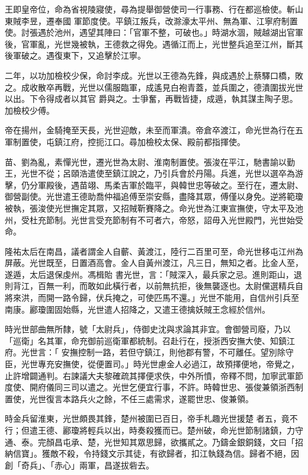 \begin{pinyinscope}
 王即皇帝位，命為省視陵寢使，尋為提舉御營使司一行事務、行在都巡檢使。斬山東賊李昱，遷奉國
 軍節度使。平鎮江叛兵，改滁濠太平州、無為軍、江寧府制置使。討張遇於池州，遇望其陣曰：「官軍不整，可破也。」時湖水涸，賊越湖出官軍後，官軍亂，光世幾被執，王德救之得免。遇循江而上，光世整兵追至江州，斷其後軍破之。遇復東下，又追擊於江寧。



 二年，以功加檢校少保，命討李成。光世以王德為先鋒，與成遇於上蔡驛口橋，敗之。成收散卒再戰，光世以儒服臨軍，成遙見白袍青蓋，並兵圍之，德潰圍拔光世以出。下令得成者以其官
 爵與之。士爭奮，再戰皆捷，成遁，執其謀主陶子思。加檢校少傅。



 帝在揚州，金騎掩至天長，光世迎敵，未至而軍潰。帝倉卒渡江，命光世為行在五軍制置使，屯鎮江府，控扼江口。尋加檢校太保、殿前都指揮使。



 苗、劉為亂，素憚光世，遷光世為太尉、淮南制置使。張浚在平江，馳書諭以勤王，光世不從；呂頤浩遣使至鎮江說之，乃引兵會於丹陽。兵進，光世以選卒為游擊，仍分軍殿後，遇苗翊、馬柔吉軍於臨平，與韓世忠等破之。至行在，遷太尉、
 御營副使。光世遣王德助喬仲福追傅至崇安縣，盡降其眾，傅僅以身免。逆將範瓊被執，張浚使光世撫定其眾，又招賊靳賽降之。命光世為江東宣撫使，守太平及池州，受杜充節制。光世言受充節制有不可者六，帝怒，詔毋入光世殿門，光世始受命。



 隆祐太后在南昌，議者謂金人自蘄、黃渡江，陸行二百里可至，命光世移屯江州為屏蔽。光世既至，日置酒高會。金人自黃州渡江，凡三日，無知之者。比金人至，遂遁，太后退保虔州。馮楫貽
 書光世，言：「賊深入，最兵家之忌。進則距山，退則背江，百無一利，而敢如此橫行者，以前無抗拒，後無襲逐也。太尉儻選精兵自將來洪，而開一路令歸，伏兵掩之，可使匹馬不還。」光世不能用，自信州引兵至南康。酈瓊圍固始縣，光世遣人招降之，又遣王德擒妖賊王念經於信州。



 時光世部曲無所隸，號「太尉兵」，侍御史沈與求論其非宜。會御營司廢，乃以「巡衛」名其軍，命充御前巡衛軍都統制。召赴行在，授浙西安撫大使、知鎮江府。光世言：「
 安撫控制一路，若但守鎮江，則他郡有警，不可離任。望別除守臣，光世專充安撫使，從便置司。」時光世慮金人必過江，故預擇便地，帝覺之，止許增闢通判。右諫議大夫黎確疏其擇便求佚，中外所憤，帝釋不問，加寧武軍節度使、開府儀同三司以遣之。光世乞便宜行事，不許。時韓世忠、張俊兼領浙西制置使，光世復言本路兵火之餘，不任三處需求，遂罷世忠、俊兼領。



 時金兵留淮東，光世頗畏其鋒，楚州被圍已百日，帝手札趣光世援楚
 者五，竟不行；但遣王德、酈瓊將輕兵以出，時奏殺獲而已。楚州破，命光世節制諸鎮，力守通、泰。完顏昌屯承、楚，光世知其眾思歸，欲攜貳之。乃鑄金銀銅錢，文曰「招納信寶」。獲敵不殺，令持錢文示其徒，有欲歸者，扣江執錢為信。歸者不絕，因創「奇兵」、「赤心」兩軍，昌遂拔砦去。




\end{pinyinscope}
